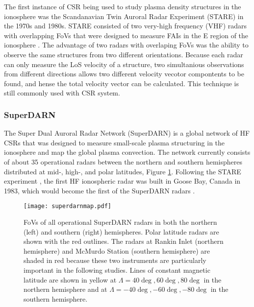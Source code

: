 The first instance of CSR being used to study plasma density structures in the ionosphere was the Scandanavian Twin Auroral Radar Experiment (STARE) in the 1970s and 1980s.  STARE consisted of two very-high frequency (VHF) radars with overlapping FoVs that were designed to measure FAIs in the E region of the ionosphere \citep{Greenwald1997}.  The advantage of two radars with overlaping FoVs was the ability to observe the same structures from two different orientations.  Because each radar can only measure the LoS velocity of a structure, two simultanious observations from different directions allows two different velocity vecotor compontents to be found, and hense the total velocity vector can be calculated.  This technique is still commonly used with CSR system.


\subsubsection{SuperDARN}
\label{sec:superdarn}
The Super Dual Auroral Radar Network (SuperDARN) is a global network of HF CSRs that was designed to measure small-scale plasma structuring in the ionosphere and map the global plasma convection.  The network currently consists of about 35 operational radars between the northern and southern hemispheres distributed at mid-, high-, and polar latitudes, Figure \ref{fig:superdarnmap}.  Following the STARE experiment \citep{Greenwald1978}, the first HF ionospheric radar was built in Goose Bay, Canada in 1983, which would become the first of the SuperDARN radars \citep{Greenwald1985}.  

\begin{figure}
	\texttt{[image: superdarnmap.pdf]}
	\caption{FoVs of all operational SuperDARN radars in both the northern (left) and southern (right) hemispheres.  Polar latitude radars are shown with the red outlines.  The radars at Rankin Inlet (northern hemisphere) and McMurdo Station (southern hemisphere) are shaded in red because these two instruments are particularly important in the following studies.  Lines of constant magnetic latitude are shown in yellow at \(\Lambda = 40\deg, 60\deg, 80\deg\) in the northern hemisphere and at \(\Lambda = -40\deg,-60\deg,-80\deg\) in the southern hemisphere.}
	\label{fig:superdarnmap}
\end{figure}

